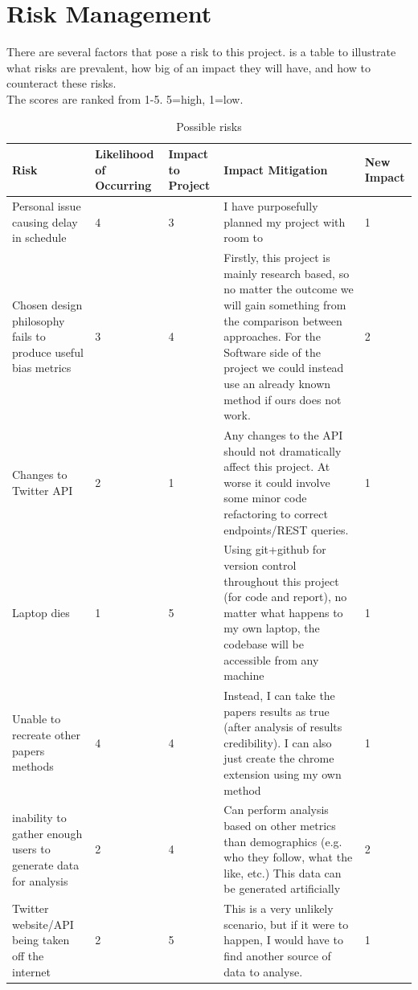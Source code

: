 \documentclass[a4paper,fleqn,10pt]{article}
\begin{document}
\section{Risk Management}
\label{sec:risk}
There are several factors that pose a risk to this project.  is a table to illustrate what risks are prevalent, how big of an impact they will have, and how to counteract these risks.\\
The scores are ranked from 1-5. 5=high, 1=low.
\newpage
\begin{table}[hbtp]
    \begin{tabular}{|p{25mm}|p{20mm}|p{13mm}|p{55mm}|p{14mm}|}
    \hline
        Risk & Likelihood of Occurring & Impact to Project & Impact Mitigation & New Impact \\
        \hline
        Personal issue causing delay in schedule & 4 & 3 & I have purposefully planned my project with room to & 1 \\
        \hline
        Chosen design philosophy fails to produce useful bias metrics & 3 & 4 & Firstly, this project is mainly research based, so no matter the outcome we will gain something from the comparison between approaches. For the Software side of the project we could instead use an already known method if ours does not work. & 2 \\
        \hline
        Changes to Twitter API & 2 & 1 & Any changes to the API should not dramatically affect this project. At worse it could involve some minor code refactoring to correct endpoints/REST queries. & 1\\
        \hline
        Laptop dies & 1 & 5 & Using git+github for version control throughout this project (for code and report), no matter what happens to my own laptop, the codebase will be accessible from any machine & 1\\
        \hline
        Unable to recreate other papers methods & 4 & 4 & Instead, I can take the papers results as true (after analysis of results credibility). I can also just create the chrome extension using my own method & 1\\
        \hline
        inability to gather enough users to generate data for analysis & 2 & 4 & Can perform analysis based on other metrics than demographics (e.g. who they follow, what the like, etc.) This data can be generated artificially & 2\\
        \hline
        Twitter website/API being taken off the internet & 2 & 5 & This is a very unlikely scenario, but if it were to happen, I would have to find another source of data to analyse. & 1\\
    \end{tabular}
    \caption{Possible risks}
    \label{tab:risk}
\end{table}
\newpage
\end{document}
